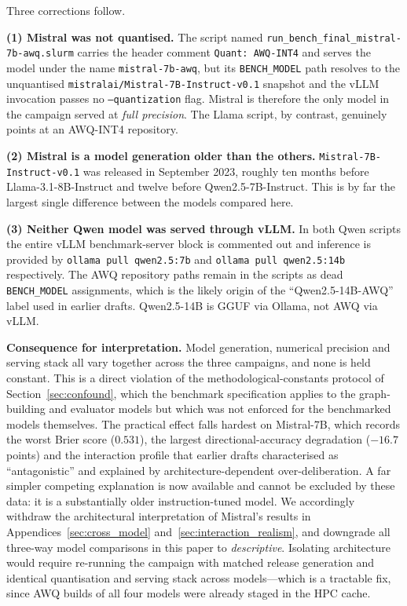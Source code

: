 \documentclass[11pt,journal,onecolumn]{IEEEtran}
\begin{document}
Three corrections follow.

\textbf{(1) Mistral was not quantised.} The script named \texttt{run\_bench\_final\_mistral-7b-awq.slurm} carries the header comment \texttt{Quant: AWQ-INT4} and serves the model under the name \texttt{mistral-7b-awq}, but its \texttt{BENCH\_MODEL} path resolves to the unquantised \texttt{mistralai/Mistral-7B-Instruct-v0.1} snapshot and the vLLM invocation passes no \texttt{--quantization} flag. Mistral is therefore the only model in the campaign served at \emph{full precision}. The Llama script, by contrast, genuinely points at an AWQ-INT4 repository.

\textbf{(2) Mistral is a model generation older than the others.} \texttt{Mistral-7B-Instruct-v0.1} was released in September 2023, roughly ten months before Llama-3.1-8B-Instruct and twelve before Qwen2.5-7B-Instruct. This is by far the largest single difference between the models compared here.

\textbf{(3) Neither Qwen model was served through vLLM.} In both Qwen scripts the entire vLLM benchmark-server block is commented out and inference is provided by \texttt{ollama pull qwen2.5:7b} and \texttt{ollama pull qwen2.5:14b} respectively. The AWQ repository paths remain in the scripts as dead \texttt{BENCH\_MODEL} assignments, which is the likely origin of the ``Qwen2.5-14B-AWQ'' label used in earlier drafts. Qwen2.5-14B is GGUF via Ollama, not AWQ via vLLM.

\textbf{Consequence for interpretation.} Model generation, numerical precision and serving stack all vary together across the three campaigns, and none is held constant. This is a direct violation of the methodological-constants protocol of Section~\ref{sec:confound}, which the benchmark specification applies to the graph-building and evaluator models but which was not enforced for the benchmarked models themselves. The practical effect falls hardest on Mistral-7B, which records the worst Brier score ($0.531$), the largest directional-accuracy degradation ($-16.7$ points) and the interaction profile that earlier drafts characterised as ``antagonistic'' and explained by architecture-dependent over-deliberation. A far simpler competing explanation is now available and cannot be excluded by these data: it is a substantially older instruction-tuned model. We accordingly withdraw the architectural interpretation of Mistral's results in Appendices~\ref{sec:cross_model} and~\ref{sec:interaction_realism}, and downgrade all three-way model comparisons in this paper to \emph{descriptive}. Isolating architecture would require re-running the campaign with matched release generation and identical quantisation and serving stack across models---which is a tractable fix, since AWQ builds of all four models were already staged in the HPC cache.
\end{document}
